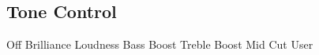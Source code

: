 \subsection{Tone Control}









































Off
Brilliance
Loudness
Bass Boost
Treble Boost
Mid Cut
User
